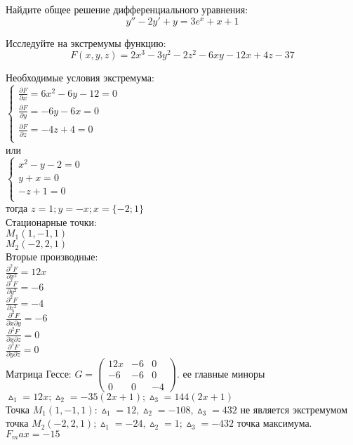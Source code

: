 \documentclass[addpoints, answers]{exam} %
\begin{document}
\begin{questions}
\begin{solution}
\end{solution}

\question	Найдите общее решение дифференциального уравнения:
\[ y''-2y'+y=3e^x+x+1
\] 

\question	Исследуйте на экстремумы функцию:
 \[ F(x,y,z)=2x^3-3y^2-2z^2-6xy-12x+4z-37
 \]
\begin{solution}
Необходимые условия экстремума: \\
$
\begin{cases}
\frac{\partial F}{\partial x}=6x^2-6y-12=0\\
\frac{\partial F}{\partial y}=-6y-6x=0\\
\frac{\partial F}{\partial z}=-4z+4=0\\
\end{cases}
$
\\
 или\\
 $
\begin{cases}
x^2-y-2=0\\
y+x=0\\
-z+1=0\\
\end{cases}
$\\
тогда 	 $z=1; y=-x; x=\{-2;1\}$\\
Стационарные точки:\\
$M_1(1,-1,1)$\\
$M_2(-2,2,1)$ \\
Вторые производные:\\
$\frac{\partial^2 F}{\partial x^2}=12x$\\
$\frac{\partial^2 F}{\partial y^2}=-6$\\
$\frac{\partial^2 F}{\partial z^2}=-4$\\
$\frac{\partial^2 F}{\partial x\partial y}=-6$\\
$\frac{\partial^2 F}{\partial x\partial z}=0$\\
$\frac{\partial^2 F}{\partial y \partial z}=0$\\
Матрица Гессе:
$
 G=\left(\begin{array}{ccc}
12x & -6 & 0\\
-6 & -6 & 0\\
0 & 0 & -4
\end{array}\right).
$
ее главные миноры $\vartriangle_1=12x; \vartriangle_2=-35(2x+1); \vartriangle_3=144(2x+1)$\\
Точка $M_1(1,-1,1): \vartriangle_1=12, \vartriangle_2=-108, \vartriangle_3=432$  не является экстремумом
точка $M_2(-2,2,1); \vartriangle_1=-24, \vartriangle_2=1 ; \vartriangle_3=-432$  точка максимума.\\
$F_max=-15$


\end{solution}
\end{questions}
\end{document}
